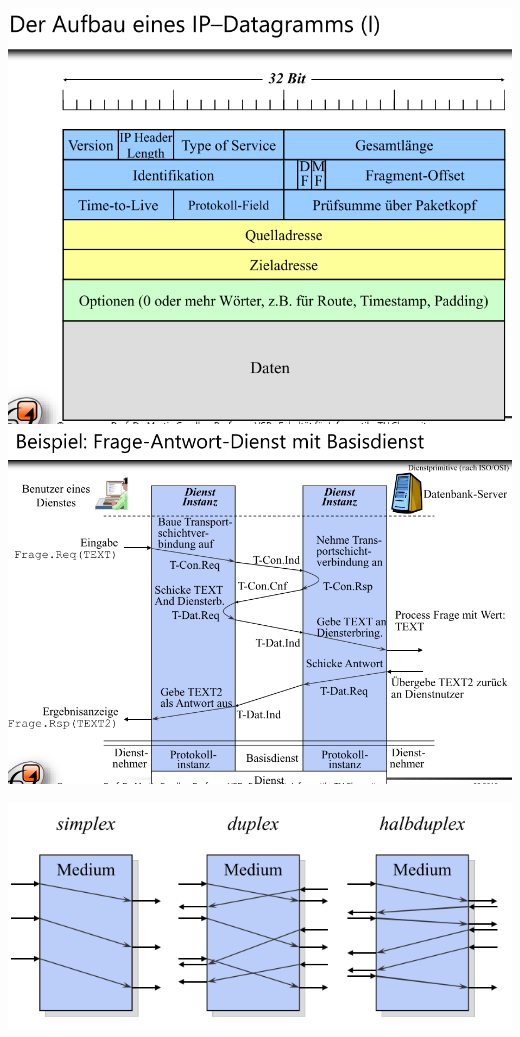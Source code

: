 \documentclass[fleqn]{article}
\begin{document}
\begin{center}
    \includegraphics[scale=0.4]{bild31.png}
    \includegraphics[scale=0.5]{bild32.png}

    \includegraphics[scale=0.5]{bild33.png}
\end{center}
\end{document}
